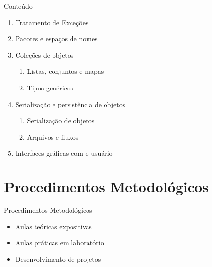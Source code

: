 \documentclass{beamer}
\begin{document}
\begin{frame}[allowframebreaks]{Conteúdo}
\begin{enumerate}
\begin{enumerate}
        \end{enumerate}
        \item Tratamento de Exceções
        \item Pacotes e espaços de nomes
        \framebreak
        \item Coleções de objetos
        \begin{enumerate}
            \item Listas, conjuntos e mapas
            \item Tipos genéricos
        \end{enumerate}
        \item Serialização e persistência de objetos
        \begin{enumerate}
            \item Serialização de objetos
            \item Arquivos e fluxos
        \end{enumerate}
        \item Interfaces gráficas com o usuário
    \end{enumerate}
\end{frame}

\section{Procedimentos Metodológicos}

\begin{frame}{Procedimentos Metodológicos}
    \begin{itemize}
        \item Aulas teóricas expositivas
        \item Aulas práticas em laboratório
        \item Desenvolvimento de projetos
    \end{itemize}
\end{frame}
\end{document}
